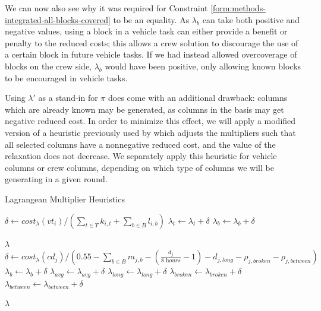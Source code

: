 \documentclass[]{article}
\begin{document}
We can now also see why it was required for Constraint \ref{form:methods-integrated-all-blocks-covered} to be an equality. As $\lambda_b$ can take both positive and negative values, using a block in a vehicle task can either provide a benefit or penalty to the reduced costs; this allows a crew solution to discourage the use of a certain block in future vehicle tasks. If we had instead allowed overcoverage of blocks on the crew side, $\lambda_b$ would have been positive, only allowing known blocks to be encouraged in vehicle tasks. 

Using $\lambda'$ as a stand-in for $\pi$ does come with an additional drawback: columns which are already known may be generated, as columns in the basis may get negative reduced cost. In order to minimize this effect, we will apply a modified version of a heuristic previously used by \citet{vanKootenNiekerk2017, Freling1997, Carraresi1995} which adjusts the multipliers such that all selected columns have a nonnegative reduced cost, and the value of the relaxation does not decrease. We separately apply this heuristic for vehicle columns or crew columns, depending on which type of columns we will be generating in a given round.
\begin{algorithm}[h]
\caption{Lagrangean Multiplier Heuristics}\label{alg:lagrange-multiplier-vt}
\begin{algorithmic}
 
  \State $\delta \gets cost_\lambda(vt_i) / (\sum_{t \in T} k_{i,t} + \sum_{b \in B} l_{i,b})$
    \State $\lambda_{t} \gets \lambda_{t} + \delta$
  \EndFor
    \State $\lambda_{b} \gets \lambda_{b} + \delta$
  \EndFor
\EndFor

\Return $\lambda$
\EndProcedure\\
 
    \State $\delta \gets cost_\lambda(cd_j) / (0.55 - \sum_{b \in B} m_{j,b} - (\frac{d_{j}}{\textit{8 hours}} - 1) - d_{j,\textit{long}} - \rho_{j,\textit{broken}} - \rho_{j,\textit{between}})$
      \State $\lambda_{b} \gets \lambda_{b} + \delta$
    \EndFor
    \State $\lambda_{avg} \gets \lambda_{avg} + \delta$
    \State $\lambda_{long} \gets \lambda_{long} + \delta$
    \State $\lambda_{broken} \gets \lambda_{broken} + \delta$
    \State $\lambda_{between} \gets \lambda_{between} + \delta$
  \EndFor

\Return $\lambda$
\EndProcedure
\end{algorithmic} 
\end{algorithm}
\end{document}
